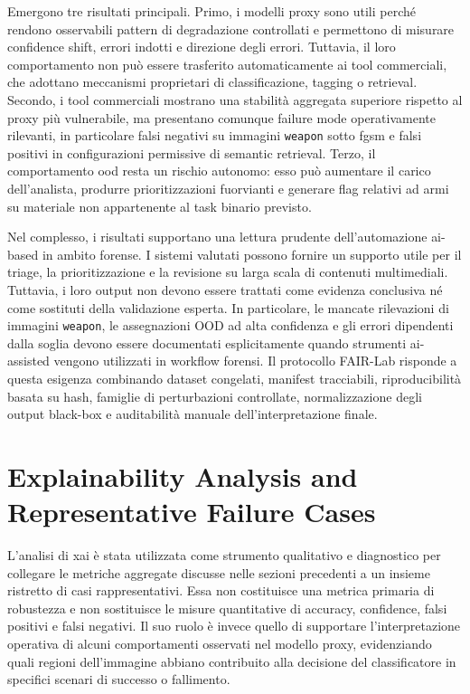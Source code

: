 Emergono tre risultati principali. Primo, i modelli proxy sono utili perché
rendono osservabili pattern di degradazione controllati e permettono di misurare
confidence shift, errori indotti e direzione degli errori. Tuttavia, il loro
comportamento non può essere trasferito automaticamente ai tool commerciali, che
adottano meccanismi proprietari di classificazione, tagging o retrieval.
Secondo, i tool commerciali mostrano una stabilità aggregata superiore rispetto
al proxy più vulnerabile, ma presentano comunque failure mode operativamente
rilevanti, in particolare falsi negativi su immagini \texttt{weapon} sotto
\gls{fgsm} e falsi positivi in configurazioni permissive di semantic retrieval.
Terzo, il comportamento \gls{ood} resta un rischio autonomo: esso può aumentare
il carico dell'analista, produrre prioritizzazioni fuorvianti e generare flag
relativi ad armi su materiale non appartenente al task binario previsto.

Nel complesso, i risultati supportano una lettura prudente dell'automazione
\gls{ai}-based in ambito forense. I sistemi valutati possono fornire un supporto
utile per il triage, la prioritizzazione e la revisione su larga scala di
contenuti multimediali. Tuttavia, i loro output non devono essere trattati come
evidenza conclusiva né come sostituti della validazione esperta. In particolare,
le mancate rilevazioni di immagini \texttt{weapon}, le assegnazioni OOD ad alta
confidenza e gli errori dipendenti dalla soglia devono essere documentati
esplicitamente quando strumenti \gls{ai}-assisted vengono utilizzati in workflow
forensi. Il protocollo FAIR-Lab risponde a questa esigenza combinando dataset
congelati, manifest tracciabili, riproducibilità basata su hash, famiglie di
perturbazioni controllate, normalizzazione degli output black-box e auditabilità
manuale dell'interpretazione finale.

\section{Explainability Analysis and Representative Failure Cases}
\label{sec:results-xai}

L'analisi di \gls{xai} è stata utilizzata come strumento qualitativo e
diagnostico per collegare le metriche aggregate discusse nelle sezioni
precedenti a un insieme ristretto di casi rappresentativi. Essa non costituisce
una metrica primaria di robustezza e non sostituisce le misure quantitative di
accuracy, confidence, falsi positivi e falsi negativi. Il suo ruolo è invece
quello di supportare l'interpretazione operativa di alcuni comportamenti
osservati nel modello proxy, evidenziando quali regioni dell'immagine abbiano
contribuito alla decisione del classificatore in specifici scenari di successo o
fallimento.

